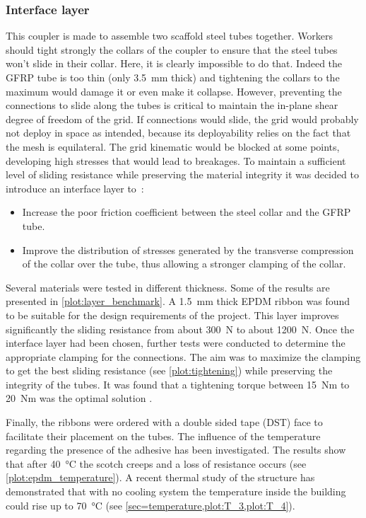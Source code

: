 \subsubsection{Interface layer}
This coupler is made to assemble two scaffold steel tubes together. Workers should tight strongly the collars of the coupler to ensure that the steel tubes won't slide in their collar. Here, it is clearly impossible to do that. Indeed the GFRP tube is too thin (only \SI{3.5}{\mm} thick) and tightening the collars to the maximum would damage it or even make it collapse. However, preventing the connections to slide along the tubes is critical to maintain the in-plane shear degree of freedom of the grid. If connections would slide, the grid would probably not deploy in space as intended, because its deployability relies on the fact that the mesh is equilateral. The grid kinematic would be blocked at some points, developing high stresses that would lead to breakages. To maintain a sufficient level of sliding resistance while preserving the material integrity it was decided to introduce an interface layer to~:
\begin{itemize}
\item Increase the poor friction coefficient between the steel collar and the GFRP tube.
\item Improve the distribution of stresses generated by the transverse compression of the collar over the tube, thus allowing a stronger clamping of the collar.
\end{itemize}

Several materials were tested in different thickness. Some of the results are presented in \cref{plot:layer_benchmark}. A \SI{1.5}{\mm} thick EPDM ribbon was found to be suitable for the design requirements of the project. This layer improves significantly the sliding resistance from about \SI{300}{\newton} to about \SI{1200}{\newton}. Once the interface layer had been chosen, further tests were conducted to determine the appropriate clamping for the connections. The aim was to maximize the clamping to get the best sliding resistance (see \cref{plot:tightening}) while preserving the  integrity of the tubes. It was found that a tightening torque between \SI{15}{Nm} to \SI{20}{Nm} was the optimal solution \cite{Tayeb2015a}.

Finally, the ribbons were ordered with a double sided tape (DST) face to facilitate their placement on the tubes. The influence of the temperature regarding the presence of the adhesive has been investigated. The results show that after \SI{40}{\celsius} the scotch creeps and a loss of resistance occurs (see \cref{plot:epdm_temperature}). A recent thermal study of the structure has demonstrated that with no cooling system the temperature inside the building could rise up to \SI{70}{\celsius} (see \cref{sec=temperature,plot:T_3,plot:T_4}).



